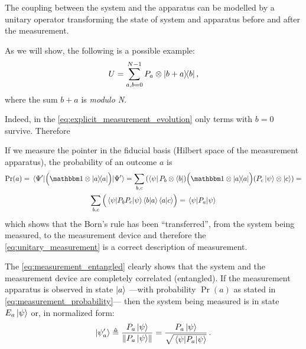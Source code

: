 The coupling between the system and the apparatus
can be modelled by
a unitary operator
transforming the state of system and apparatus before and after the measurement.

As we will show, the following is a possible example:
\begin{equation}\label{eq:unitary_measurement}
  U = \sum_{a, b = 0}^{N-1} P_a \otimes \ketbra{b+a}{b} \text{,}
\end{equation}
where the sum $b+a$ is \emph{modulo N}.

Indeed, in the \ref{eq:explicit_measurement_evolution} only terms with $b=0$ survive.
Therefore

If we measure the pointer in the fiducial basis
(Hilbert space of the measurement apparatus),
the probability of an outcome $a$ is
\begin{multline}\label{eq:measurement_probability}
  \Pr(a) = \expval{\qty\Big(\idop\ox\ketbra{a})}{\Psi^{\prime}} =
    \sum_{b,c}
      \qty(\bra{\psi}P_{b}\ox\bra{b})
      \qty\Big(\idop\ox\ketbra{a})
      \qty(P_{c}\ket{\psi}\ox\ket{c}) = \\
    \sum_{b,c}\qty\Big(\expval{P_bP_c}{\psi} \braket{b}{a} \braket{a}{c}) =
    \expval{P_a}{\psi}
\end{multline}
which shows that the Born's rule has been ``transferred'', from the system being
measured, to the measurement device and therefore the
\eqref{eq:unitary_measurement} is a correct description of measurement.

The \eqref{eq:measurement_entangled} clearly shows that the system
and the measurement device are completely correlated (entangled).
If the measurement apparatus is observed in state $\ket{a}$
---with probability $\Pr(a)$ as stated in \eqref{eq:measurement_probability}---
then the system being measured is in state $E_{a}\ket{\psi}$
or, in normalized form:
\begin{equation}\label{eq:normalized_collapse}
  \ket{\psi^\prime_a} \triangleq \frac{P_{a}\ket{\psi}}{\norm{P_{a}\ket{\psi}}}
    = \frac{P_{a}\ket{\psi}}{\sqrt{\expval{P_a}{\psi}}} \,\text{.}
\end{equation}


